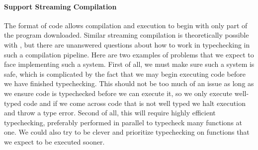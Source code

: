 \paragraph{Support Streaming Compilation}
The format of \wasm code allows compilation and execution to begin with only part of the program downloaded.
Similar streaming compilation is theoretically possible with \name, but there are unanswered questions about how to work in typechecking in such a compilation pipeline.
Here are two examples of problems that we expect to face implementing such a system.
First of all, we must make sure such a system is safe, which is complicated by the fact that we may begin executing code before we have finished typechecking.
This should not be too much of an issue as long as we ensure code is typechecked before we can execute it, so we only execute well-typed code and if we come across code that is not well typed we halt execution and throw a type error.
Second of all, this will require highly efficient typechecking, preferably performed in parallel to typecheck many functions at one.
We could also try to be clever and prioritize typechecking on functions that we expect to be executed sooner.
